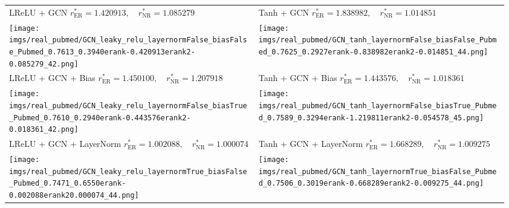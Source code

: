    \begin{tabular}{p{0.48\linewidth}|p{0.48\linewidth}}
        \toprule
        \makecell[c]{LReLU + GCN \\ $r^*_\mathrm{ER}=1.420913, \quad r^*_\mathrm{NR}=1.085279$} & \makecell[c]{Tanh + GCN \\ $r^*_\mathrm{ER}=1.838982, \quad r^*_\mathrm{NR}=1.014851$}\\ 
        \hspace{30pt}\texttt{[image: imgs/real\_pubmed/GCN\_leaky\_relu\_layernormFalse\_biasFalse\_Pubmed\_0.7613\_0.3940erank-0.420913erank2-0.085279\_42.png]} & \hspace{30pt}\texttt{[image: imgs/real\_pubmed/GCN\_tanh\_layernormFalse\_biasFalse\_Pubmed\_0.7625\_0.2927erank-0.838982erank2-0.014851\_44.png]}\\
        \midrule
        \makecell[c]{LReLU + GCN + Bias \\ $r^*_\mathrm{ER}=1.450100, \quad r^*_\mathrm{NR}=1.207918$} & \makecell[c]{Tanh + GCN + Bias \\ $r^*_\mathrm{ER}=1.443576, \quad r^*_\mathrm{NR}=1.018361$}\\
        \hspace{30pt}\texttt{[image: imgs/real\_pubmed/GCN\_leaky\_relu\_layernormFalse\_biasTrue\_Pubmed\_0.7610\_0.2940erank-0.443576erank2-0.018361\_42.png]} & \hspace{30pt}\texttt{[image: imgs/real\_pubmed/GCN\_tanh\_layernormFalse\_biasTrue\_Pubmed\_0.7589\_0.3294erank-1.219811erank2-0.054578\_45.png]}\\
        \midrule
        \makecell[c]{LReLU + GCN + LayerNorm \\ $r^*_\mathrm{ER}=1.002088, \quad r^*_\mathrm{NR}=1.000074$} & \makecell[c]{Tanh + GCN + LayerNorm \\ $r^*_\mathrm{ER}=1.668289, \quad r^*_\mathrm{NR}=1.009275$}\\
        \hspace{30pt}\texttt{[image: imgs/real\_pubmed/GCN\_leaky\_relu\_layernormTrue\_biasFalse\_Pubmed\_0.7471\_0.6550erank-0.002088erank20.000074\_44.png]} & \hspace{30pt}\texttt{[image: imgs/real\_pubmed/GCN\_tanh\_layernormTrue\_biasFalse\_Pubmed\_0.7506\_0.3019erank-0.668289erank2-0.009275\_44.png]}\\

\end{tabular}
